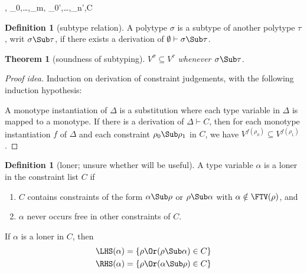 \documentclass{amsart}
\newtheorem{theorem}[subsection]{Theorem}
\theoremstyle{definition}
\newtheorem{definition}[subsection]{Definition}
\begin{document}
{
\Delta,\alpha \vdash
\rho_0\Sub\alpha,\ldots,\rho_m\Sub\alpha,
\alpha\Sub\rho_0',\ldots,\alpha\Sub\rho_n',C
}

\begin{definition}
[subtype relation]
A polytype $\sigma$ is a subtype of another polytype $\tau$, writ
$\sigma \Sub \tau$, if there exists a derivation of
$\emptyset\vdash\sigma\Sub\tau$.
\end{definition}

\begin{theorem}
[soundness of subtyping]
\label{subsound}
$V^\sigma\subseteq V^\tau$ whenever $\sigma\Sub\tau$.
\end{theorem}

\begin{proof}[Proof idea]
Induction on derivation of constraint judgements, with the
following induction hypothesis:

A monotype instantiation of $\Delta$ is a substitution where each
type variable in $\Delta$ is mapped to a monotype. If there is a
derivation of $\Delta\vdash C$, then for each monotype
instantiation $f$ of $\Delta$ and each constraint
$\rho_0\Sub\rho_1$ in $C$, we have $V^{f(\rho_0)}\subseteq
V^{f(\rho_1)}$.
\end{proof}

\begin{definition}
[loner; unsure whether will be useful]
\label{loner}
A type variable $\alpha$ is a loner in the constraint list $C$ if
\begin{enumerate}
\item $C$ contains constraints of the form
$\alpha\Sub\rho$ or $\rho\Sub\alpha$ with
$\alpha\notin\FTV(\rho)$, and
\item $\alpha$ never occurs free in other constraints of $C$.
\end{enumerate}
If $\alpha$ is a loner in $C$, then
\begin{align*}
\LHS(\alpha)&=\{\rho \Or (\rho\Sub\alpha) \in C\}\\
\RHS(\alpha)&=\{\rho \Or (\alpha\Sub\rho) \in C\}\\
\end{align*}
\end{definition}




\end{document}
